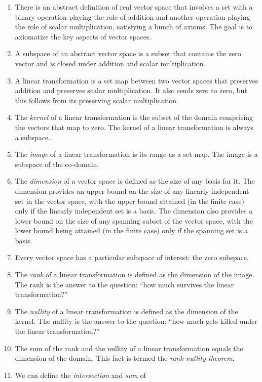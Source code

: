 \documentclass[10pt]{amsart}
\begin{document}
\begin{enumerate}
\item There is an abstract definition of real vector space that
  involves a set with a binary operation playing the role of addition
  and another operation playing the role of scalar multiplication,
  satisfying a bunch of axioms. The goal is to axiomatize the key
  aspects of vector spaces.
\item A subspace of an abstract vector space is a subset that contains
  the zero vector and is closed under addition and scalar
  multiplication.
\item A linear transformation is a set map between two vector spaces
  that preserves addition and preserves scalar multiplication. It also
  sends zero to zero, but this follows from its preserving scalar
  multiplication.
\item The {\em kernel} of a linear transformation is the subset of the
  domain comprising the vectors that map to zero. The kernel of a
  linear transformation is always a subspace.
\item The {\em image} of a linear transformation is its range as a set
  map. The image is a subspace of the co-domain.
\item The {\em dimension} of a vector space is defined as the size of
  any basis for it. The dimension provides an upper bound on the size
  of any linearly independent set in the vector space, with the upper
  bound attained (in the finite case) only if the linearly independent
  set is a basis. The dimension also provides a lower bound on the
  size of any spanning subset of the vector space, with the lower
  bound being attained (in the finite case) only if the spanning set
  is a basis.
\item Every vector space has a particular subspace of interest: the
  zero subspace.
\item The {\em rank} of a linear transformation is defined as the
  dimension of the image. The rank is the answer to the question:
  ``how much survives the linear transformation?''
\item The {\em nullity} of a linear transformation is defined as the
  dimension of the kernel. The nullity is the answer to the question:
  ``how much gets killed under the linear transformation?''
\item The sum of the rank and the nullity of a linear transformation
  equals the dimension of the domain. This fact is termed the {\em
    rank-nullity theorem}.
\item We can define the {\em intersection} and {\em sum} of

\end{enumerate}
\end{document}
